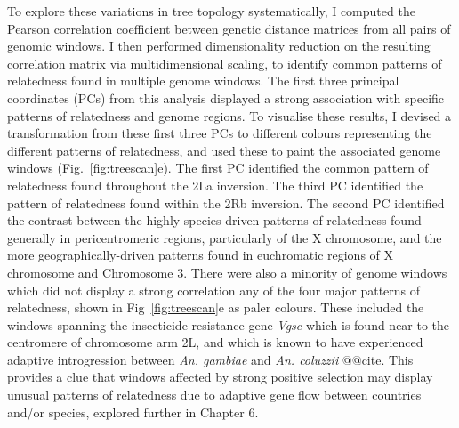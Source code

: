 \documentclass[a4paper,11pt,abstracton,hidelinks]{scrartcl}
\begin{document}
To explore these variations in tree topology systematically, I computed the Pearson correlation coefficient between genetic distance matrices from all pairs of genomic windows.
%
I then performed dimensionality reduction on the resulting correlation matrix via multidimensional scaling, to identify common patterns of relatedness found in multiple genome windows.
%
The first three principal coordinates (PCs) from this analysis displayed a strong association with specific patterns of relatedness and genome regions.
%
To visualise these results, I devised a transformation from these first three PCs to different colours representing the different patterns of relatedness, and used these to paint the associated genome windows (Fig.~\ref{fig:treescan}e).
%
The first PC identified the common pattern of relatedness found throughout the 2La inversion.
%
The third PC identified the pattern of relatedness found within the 2Rb inversion.
%
The second PC identified the contrast between the highly species-driven patterns of relatedness found generally in pericentromeric regions, particularly of the X chromosome, and the more geographically-driven patterns found in euchromatic regions of X chromosome and Chromosome 3.
%
There were also a minority of genome windows which did not display a strong correlation any of the four major patterns of relatedness, shown in Fig~\ref{fig:treescan}e as paler colours.
%
These included the windows spanning the insecticide resistance gene \textit{Vgsc} which is found near to the centromere of chromosome arm 2L, and which is known to have experienced adaptive introgression between \textit{An. gambiae} and \textit{An. coluzzii} @@cite.
%
This provides a clue that windows affected by strong positive selection may display unusual patterns of relatedness due to adaptive gene flow between countries and/or species, explored further in Chapter 6.
\end{document}
